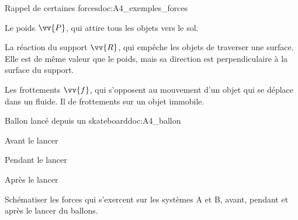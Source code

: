 \begin{doc}{Rappel de certaines forces}{doc:A4_exemples_forces}
  \begin{listePoints}
    \item Le poids $\vv{P}$, qui attire tous les objets vers le sol.
    \item La réaction du support $\vv{R}$, qui empêche les objets de traverser une surface.
    Elle est de même valeur que le poids, mais sa direction est perpendiculaire à la surface du support.
    \item Les frottements $\vv{f}$, qui s'opposent au mouvement d'un objet qui se déplace dans un fluide.
    Il  de frottements sur un objet immobile.
  \end{listePoints}
\end{doc}


\begin{doc}{Ballon lancé depuis un skateboard}{doc:A4_ballon}
  \begin{flushright}
    \vspace*{-18pt}
  \end{flushright}
  \begin{multicols}{3}
    \centering
    
    Avant le lancer
    

    Pendant le lancer
    

    Après le lancer
  \end{multicols}
\end{doc}





\schematisation Schématiser les forces qui s'exercent sur les systèmes A et B, avant, pendant et après le lancer du ballons. 

